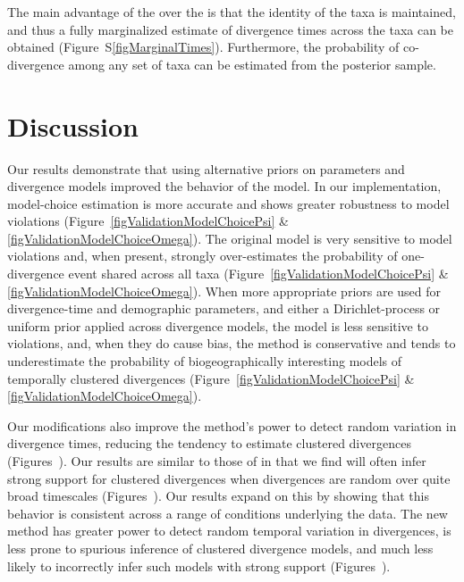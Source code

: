 The main advantage of the \npModelDPPOrdered over the \npModelDPP is that the
identity of the taxa is maintained, and thus a fully marginalized estimate of
divergence times across the taxa can be obtained
(Figure~S\ref{figMarginalTimes}).
Furthermore, the probability of co-divergence among any set of taxa can be
estimated from the posterior sample.

\section*{Discussion}
Our results demonstrate that using alternative priors on parameters and
divergence models improved the behavior of the \msb model.
In our implementation, model-choice estimation is more accurate and shows
greater robustness to model violations
(Figure~\ref{figValidationModelChoicePsi} \&
\ref{figValidationModelChoiceOmega}).
The original model is very sensitive to model violations and, when present,
strongly over-estimates the probability of one-divergence event shared
across all taxa
(Figure~\ref{figValidationModelChoicePsi} \&
\ref{figValidationModelChoiceOmega}).
When more appropriate priors are used for divergence-time and demographic
parameters, and either a Dirichlet-process or uniform prior applied across
divergence models, the model is less sensitive to violations, and, when they do
cause bias, the method is conservative and tends to underestimate the
probability of biogeographically interesting models of temporally clustered
divergences (Figure~\ref{figValidationModelChoicePsi} \&
\ref{figValidationModelChoiceOmega}).

Our modifications also improve the method's power to detect random
variation in divergence times, reducing the tendency to estimate clustered
divergences
(Figures~).
Our results are similar to those of \citet{Oaks2012} in that we find
\msb will often infer strong support for clustered divergences when
divergences are random over quite broad timescales
(Figures~).
Our results expand on this by showing that this behavior is consistent
across a range of conditions underlying the data.
The new method \dppmsbayes has greater power to detect random temporal variation in
divergences, is less prone to spurious inference of clustered divergence
models, and much less likely to incorrectly infer such models with strong
support
(Figures~).

